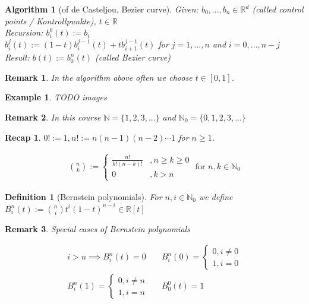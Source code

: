 \documentclass[]{article}
\newtheorem{definition}{Definition}
\newtheorem{algorithm}{Algorithm}
\newtheorem{example}{Example}
\newtheorem{remark}{Remark}
\newtheorem{recap}{Recap}
\begin{document}
\begin{algorithm}[of de Casteljou, Bezier curve]
	Given: $b_0,...,b_n \in \mathbb{R}^d$ (called control points / Kontrollpunkte), $t \in \mathbb{R}$
	\\Recursion: $b_i^0(t) := b_i$
	\\$b_i^j(t) := (1-t)b_i^{j-1}(t) + tb_{i+1}^{j-1}(t)$ for $j=1,...,n$ and $i=0,...,n-j$
	\\Result: $b(t):=b_0^n(t)$ (called Bezier curve)
	
\end{algorithm}

\begin{remark}
	In the algorithm above often we choose $t\in[0,1]$.
\end{remark}

\begin{example}
	TODO images
\end{example}

\begin{remark}
	In this course $\mathbb{N}=\{1,2,3,...\}$ and $\mathbb{N}_0=\{0,1,2,3,...\}$
\end{remark}

\begin{recap}
	$0! := 1, n! := n(n-1)(n-2) \cdots 1$ for $n \geq 1$.
	
	\begin{align*}
		\binom{n}{k} := \begin{cases}
			\frac{n!}{k!(n-k)!}&, n\geq k \geq 0\\
			0&, k > n
		\end{cases} \text{ for } n,k \in \mathbb{N}_0
	\end{align*}
\end{recap}

\begin{definition}[Bernstein polynomials]
	For $n,i \in \mathbb{N}_0$ we define $B_i^n(t) := \binom{n}{i} t^i (1-t)^{n-i} \in \mathbb{R}[t]$
\end{definition}

\begin{remark}
	Special cases of Bernstein polynomials
	
	\begin{align*}
		i > n \implies B_i^n(t) = 0 && B_i^n(0) = \begin{cases}0, i\not= 0\\ 1, i=0 \end{cases} \\
		B_i^n(1) = \begin{cases}0, i\not= n\\ 1, i=n \end{cases} && B_0^0(t) = 1
	\end{align*}
\end{remark}
\end{document}
